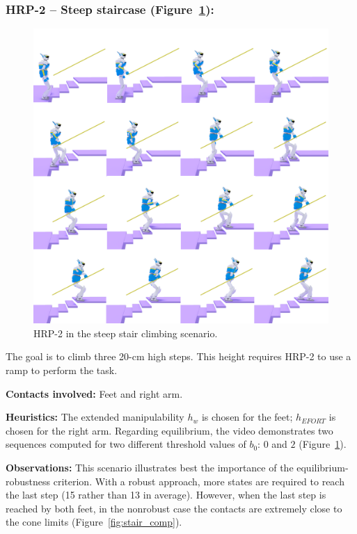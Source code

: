 \subsubsection{HRP-2 -- Steep staircase (Figure~\ref{fig:stair_robust}):}

\begin{figure}
  \centering
  \includegraphics[width=0.5\linewidth]{figures/stair}
  \caption{
           HRP-2 in the steep stair climbing scenario. }
		   \label{fig:stair_robust}
\end{figure}

The goal is to climb three 20-cm high steps. This height requires HRP-2 to use a ramp to perform the task.

\noindent\textbf{Contacts involved:} Feet and right arm.

\noindent\textbf{Heuristics:} The extended manipulability $h_w$ is chosen for the feet; $h_{EFORT}$ is chosen for the right arm.
Regarding equilibrium, the video demonstrates two sequences computed for two different threshold values of $b_0$: $0$ and $2$ (Figure~\ref{fig:stair_robust}). 

\noindent\textbf{Observations:}
This scenario illustrates best the importance of the equilibrium-robustness criterion.
With a robust approach, more states are required to reach the last step (15 rather than 13 in average).
However, when the last step is reached by both feet, in the nonrobust case the contacts are extremely close to 
the cone limits (Figure~\ref{fig:stair_comp}).


